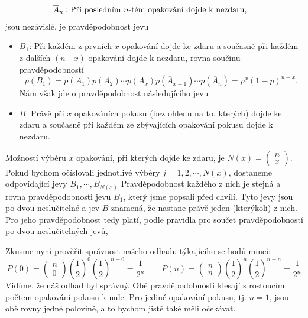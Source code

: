 \begin{example}
\begin{align*}
    \overline{A}_n     &: \text{Při posledním \(n\)-tém opakování dojde k nezdaru,}
  \normalsize
  \end{align*}
  jsou nezávislé, je pravděpodobnost jevu
  \begin{itemize}
    \item \(B_1\): Při každém z prvních \(x\) opakování dojde ke zdaru a současně při každém z 
          dalších \((n — x)\) opakování dojde k nezdaru, rovna součinu pravděpodobností
          \begin{equation*}
            p(B_1) = p(A_1)p(A_2)\cdots p(A_x)p(\overline{A}_{x+1})\cdots p(\overline{A}_n) 
                   = p^x (1 - p)^{n-x}.
          \end{equation*}
          Nám však jde o pravděpodobnost následujícího jevu
    \item \(B\): Právě při \(x\) opakováních pokusu (bez ohledu na to, kterých) dojde ke zdaru a 
          současně při každém ze zbývajících opakování pokusu dojde k nezdaru.
  \end{itemize}
  
  Možností výběru \(x\) opakování, při kterých dojde ke zdaru, je \(N(x) = \begin{pmatrix} n \\ 
  x\end{pmatrix}\). Pokud bychom očíslovali jednotlivé výběry \(j = 1, 2, \cdots, N(x)\), dostaneme 
  odpovídající jevy \(B_1, \cdots, B_{N(x)}\) Pravděpodobnost každého z nich je stejná a rovna 
  pravděpodobnosti jevu \(B_1\), který jsme popsali před chvílí. Tyto jevy jsou po dvou 
  neslučitelné a jev \(B\) znamená, že nastane právě jeden (kterýkoli) z nich. Pro jeho 
  pravděpodobnost tedy platí, podle pravidla pro součet pravděpodobností po dvou neslučitelných 
  jevů,
   
  Zkusme nyní prověřit správnost našeho odhadu týkajícího se hodů mincí:
  \begin{equation*}
    P(0) = \begin{pmatrix} n \\ 0\end{pmatrix} 
           \left(\dfrac{1}{2}\right)^0\left(\dfrac{1}{2}\right)^{n-0} 
         = \dfrac{1}{2^n}            \qquad
    P(n) = \begin{pmatrix} n \\ n\end{pmatrix} 
           \left(\dfrac{1}{2}\right)^n\left(\dfrac{1}{2}\right)^{n-n} 
         = \dfrac{1}{2^n}     
  \end{equation*}
  Vidíme, že náš odhad byl správný. Obě pravděpodobnosti klesají s rostoucím počtem opakování 
  pokusu k nule.  Pro jediné opakování pokusu, tj. \(n = 1\), jsou obě rovny jedné polovině, a to 
  bychom jistě také měli očekávat. 
  

\end{example}
